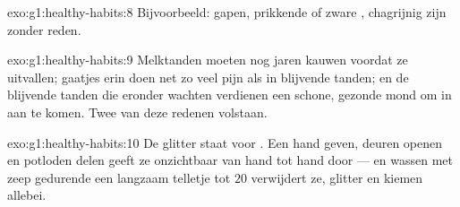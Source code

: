 \begin{solution}{exo:g1:healthy-habits:8}
Bijvoorbeeld: gapen, prikkende of zware , chagrijnig zijn zonder
reden.
\end{solution}

\begin{solution}{exo:g1:healthy-habits:9}
Melktanden moeten nog jaren kauwen voordat ze uitvallen; gaatjes erin
doen net zo veel pijn als in blijvende tanden; en de blijvende tanden
die eronder wachten verdienen een schone, gezonde mond om in aan te
komen. Twee van deze redenen volstaan.
\end{solution}

\begin{solution}{exo:g1:healthy-habits:10}
De glitter staat voor . Een hand geven, deuren openen en
potloden delen geeft ze onzichtbaar van hand tot hand door --- en
wassen met zeep gedurende een langzaam telletje tot $20$ verwijdert ze,
glitter en kiemen allebei.
\end{solution}
